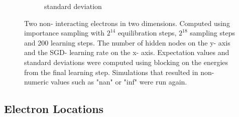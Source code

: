 \documentclass[11pt,a4paper,titlepage]{article}
\begin{document}
\begin{figure}[H]
\begin{subfigure}{.5\textwidth}
\caption{standard deviation}\label{J2}
\end{subfigure}
\caption[as]{Two non- interacting electrons in two dimensions. Computed using importance sampling with $2^{14}$ equilibration steps, $2^{18}$ sampling steps and 200 learning steps. The number of hidden nodes on the y- axis and the SGD- learning rate on the x- axis. Expectation values and standard deviations were computed using blocking on the energies from the final learning step. Simulations that resulted in non- numeric values such as "nan" or "inf" were run again.}
\label{fig:interacting_sweep}
\end{figure}
\subsection{Electron Locations}
\end{document}
